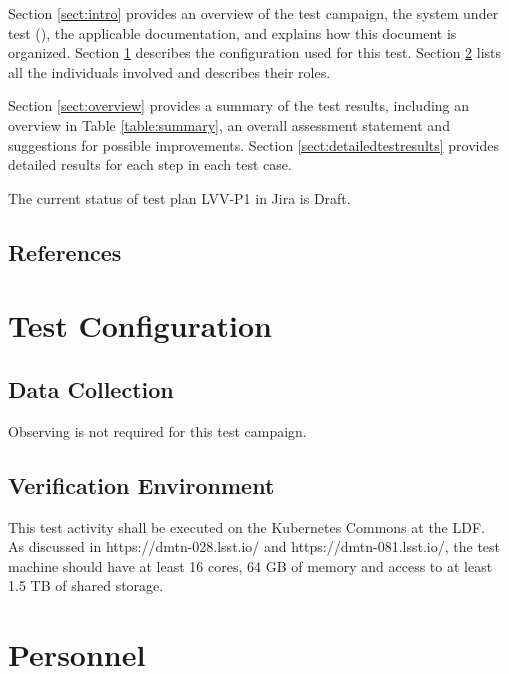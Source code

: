 \documentclass[DM,lsstdraft,STR,toc]{lsstdoc}
\begin{document}
Section \ref{sect:intro} provides an overview of the test campaign, the system under test (\product{}), the applicable documentation, and explains how this document is organized.
Section \ref{sect:configuration}  describes the configuration used for this test.
Section \ref{sect:personnel} lists all the individuals involved and describes their roles.

Section \ref{sect:overview} provides a summary of the test results, including an overview in Table \ref{table:summary}, an overall assessment statement and suggestions for possible improvements.
Section \ref{sect:detailedtestresults} provides detailed results for each step in each test case.

The current status of test plan LVV-P1 in Jira is Draft.

\subsection{References}
\label{sect:references}
\renewcommand{\refname}{}

\section{Test Configuration}
\label{sect:configuration}

\subsection{Data Collection}

  Observing is not required for this test campaign.

\subsection{Verification Environment}
\label{sect:hwconf}
  This test activity shall be executed on the Kubernetes Commons at the
LDF.\\
As discussed in https://dmtn-028.lsst.io/ and https://dmtn-081.lsst.io/,
the test machine should have at least 16 cores, 64 GB of memory and
access to at least 1.5 TB of shared storage.





\section{Personnel}
\label{sect:personnel}
\end{document}
